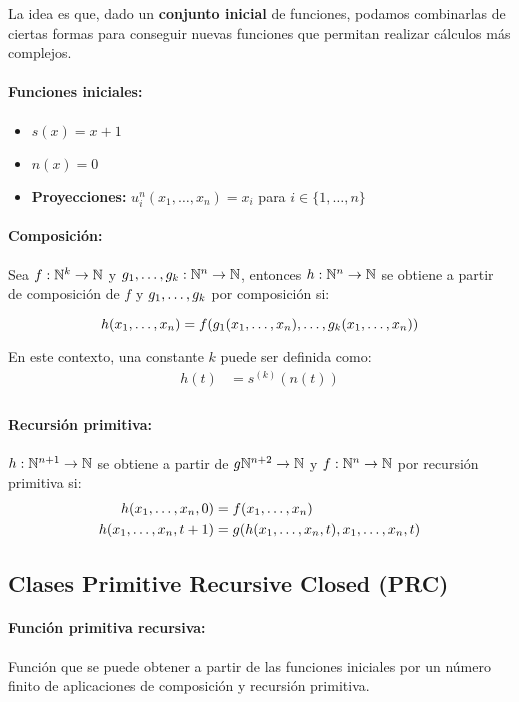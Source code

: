 	La idea es que, dado un \textbf{conjunto inicial} de funciones, podamos combinarlas de ciertas formas para conseguir nuevas funciones que permitan realizar cálculos más complejos.
	
	\paragraph{Funciones iniciales:}
	\begin{itemize}
		\item $s(x) = x + 1$
		\item $n(x) = 0$
		\item \textbf{Proyecciones:} $u_i^n(x_1,\dots,x_n) = x_i$ para $i\in\{1,\dots,n\}$
	\end{itemize}

	\paragraph{Composición:} Sea $f:\nat^k\to\nat$ y $\xDots{g}{k}:\nat^n\to\nat$, entonces $h:\nat^n\to\nat$ se obtiene a partir de composición de $f$ y $\xDots{g}{k}$ por composición si:
	
	$$h(\xDots{x}{n}) = \comp{f}{k}{g}{n}$$
	
	En este contexto, una constante $k$ puede ser definida como:
	\begin{align*}
	h(t) &= s^{(k)}(n(t)) \\
	\end{align*}
	
	\paragraph{Recursión primitiva:} $h:\nat^{n+1}\to\nat$ se obtiene a partir de $g\nat^{n+2}\to\nat$ y $f:\nat^n\to\nat$ por recursión primitiva si:
	\begin{align*}
		h(\xDots{x}{n}, 0) &= f(\xDots{x}{n}) \\
		h(\xDots{x}{n}, t+1) &= g(h(\xDots{x}{n}, t), \xDots{x}{n}, t) \\
	\end{align*}
	
	\subsection{Clases Primitive Recursive Closed (PRC)} 
	
	\paragraph{Función primitiva recursiva:} Función que se puede obtener a partir de las funciones iniciales por un número finito de aplicaciones de composición y recursión primitiva.
	
